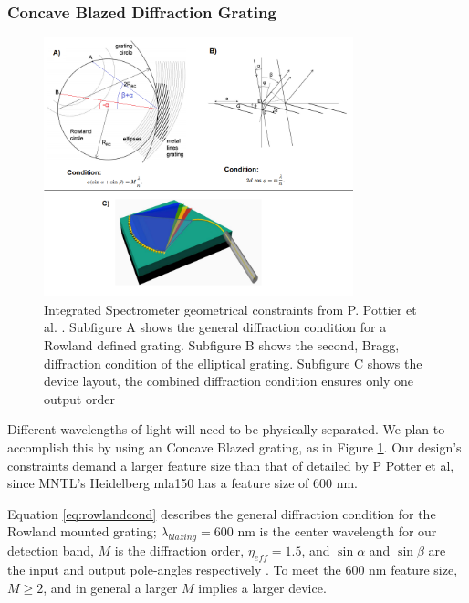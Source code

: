 \documentclass{article}
\begin{document}
        \subsubsection{Concave Blazed Diffraction Grating}
        \begin{figure}[H]
        \centering
        \includegraphics[width=0.8\textwidth]{images/gratingconditions.png}
        \caption{\label{fig:spec_dia}Integrated Spectrometer geometrical constraints from P. Pottier et al. \cite{Pottier2014IntegratedInsulator}. Subfigure A shows the general diffraction condition for a Rowland defined grating. Subfigure B shows the second, Bragg, diffraction condition of the elliptical grating. Subfigure C shows the device layout, the combined diffraction condition ensures only one output order \cite{Pottier2014IntegratedInsulator, Wang2019IntegratedAstronomy}}
        \end{figure}
        
        Different wavelengths of light will need to be physically separated. We plan to accomplish this by using an Concave Blazed grating, as in Figure \ref{fig:spec_dia}. Our design's constraints demand a larger feature size than that of detailed by P Potter et al, since MNTL's Heidelberg mla150 has a feature size of 600 nm.
        
        Equation \ref{eq:rowlandcond} describes the general diffraction condition for the Rowland mounted grating; $\lambda_{blazing} = 600$ nm is the center wavelength for our detection band, $M$ is the diffraction order, $\eta_{eff} = 1.5$, and $\sin{\alpha}$ and $\sin{\beta}$ are the input and output pole-angles respectively \cite{Packirisamy2012Mono-OrderGrating}. To meet the 600 nm feature size, $M \geq 2$, and in general a larger $M$ implies a larger device.
        
\end{document}
